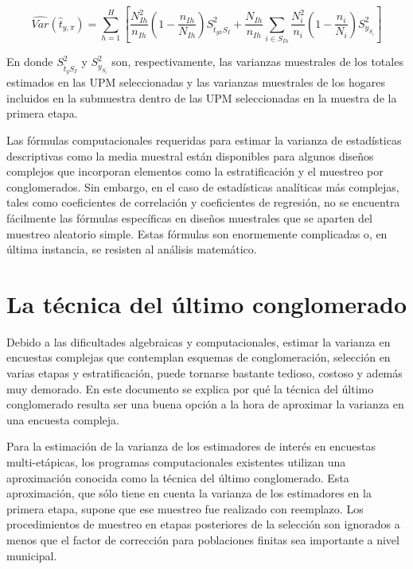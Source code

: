 \documentclass[
  10pt,
  spanish,
]{book}
\begin{document}
\[
\widehat{Var}(\hat{t}_{y,\pi})=
\sum_{h=1}^H\left[\frac{N_{Ih}^2}{n_{Ih}}\left(1-\frac{n_{Ih}}{N_{Ih}}\right)S^2_{\hat{t}_{yh}S_I}+
\frac{N_{Ih}}{n_{Ih}}\sum_{i\in S_{Ih}}\frac{N_i^2}{n_i}\left(1-\frac{n_i}{N_i}\right)S^2_{y_{S_i}}\right]
\]

En donde \(S^2_{\hat{t}_{y}S_I}\) y \(S^2_{y_{S_i}}\) son, respectivamente, las varianzas muestrales de los totales estimados en las UPM seleccionadas y las varianzas muestrales de los hogares incluidos en la submuestra dentro de las UPM seleccionadas en la muestra de la primera etapa.

Las fórmulas computacionales requeridas para estimar la varianza de estadísticas descriptivas como la media muestral están disponibles para algunos diseños complejos que incorporan elementos como la estratificación y el muestreo por conglomerados. Sin embargo, en el caso de estadísticas analíticas más complejas, tales como coeficientes de correlación y coeficientes de regresión, no se encuentra fácilmente las fórmulas específicas en diseños muestrales que se aparten del muestreo aleatorio simple. Estas fórmulas son enormemente complicadas o, en última instancia, se resisten al análisis matemático.

\hypertarget{la-tuxe9cnica-del-uxfaltimo-conglomerado}{%
\section{La técnica del último conglomerado}\label{la-tuxe9cnica-del-uxfaltimo-conglomerado}}

Debido a las dificultades algebraicas y computacionales, estimar la varianza en encuestas complejas que contemplan esquemas de conglomeración, selección en varias etapas y estratificación, puede tornarse bastante tedioso, costoso y además muy demorado. En este documento se explica por qué la técnica del último conglomerado resulta ser una buena opción a la hora de aproximar la varianza en una encuesta compleja.

Para la estimación de la varianza de los estimadores de interés en encuestas multi-etápicas, los programas computacionales existentes utilizan una aproximación conocida como la técnica del último conglomerado. Esta aproximación, que sólo tiene en cuenta la varianza de los estimadores en la primera etapa, supone que ese muestreo fue realizado con reemplazo. Los procedimientos de muestreo en etapas posteriores de la selección son ignorados a menos que el factor de corrección para poblaciones finitas sea importante a nivel municipal.
\end{document}
